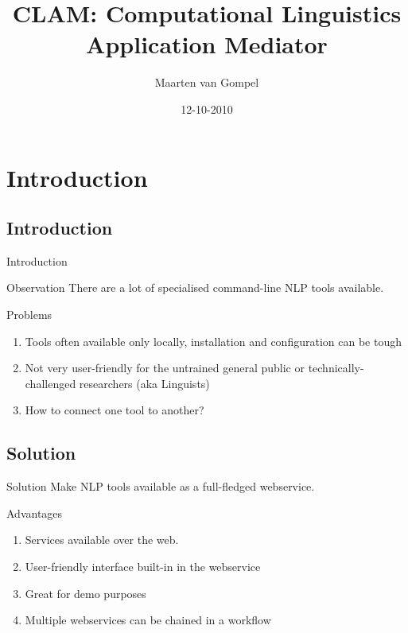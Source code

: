 \documentclass[compress]{beamer}
\title{CLAM: Computational Linguistics Application Mediator}
\author{Maarten van Gompel}
\date{12-10-2010}
\begin{document}
\begin{frame}
	\titlepage\smallraccoon\ilkuvt
\end{frame}

\section{Introduction}

\subsection{Introduction}
\begin{frame}{Introduction}

    \begin{block}{Observation}
        There are a lot of specialised command-line NLP tools available.
    \end{block}

    \begin{block}{Problems}
        \begin{enumerate}
            \item Tools often available only locally, installation and configuration can be tough
            \item Not very user-friendly for the untrained general public or technically-challenged researchers (aka Linguists)
            \item How to connect one tool to another?
        \end{enumerate}
    \end{block}
\end{frame}


\subsection{Solution}
\begin{frame}
    \begin{block}{Solution} 
        Make NLP tools available as a full-fledged webservice.
    \end{block}

    \begin{block}{Advantages}

        \begin{enumerate}
            \item Services available over the web.
            \item User-friendly interface built-in in the webservice
            \item Great for demo purposes
            \item Multiple webservices can be chained in a workflow
        \end{enumerate}

    \end{block}
\end{frame}
\end{document}
